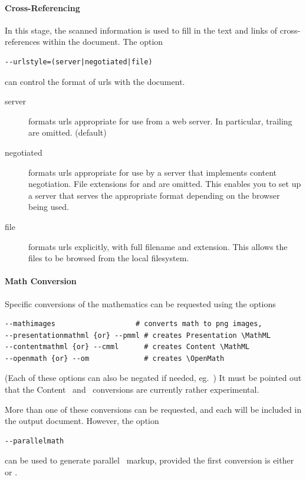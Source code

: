 \documentclass{book}
\begin{document}
\paragraph{Cross-Referencing}
In this stage, the scanned information is used to fill in the
text and links of cross-references within the document.
The option
\begin{lstlisting}[style=shell]
--urlstyle=(server|negotiated|file)
\end{lstlisting}
can control the format of urls with the document.
\begin{description}
  \item[server] formats urls appropriate for use from a web server.
    In particular, trailing  are omitted. (default)
  \item[negotiated] formats urls appropriate for use by a server
    that implements content negotiation. File extensions for 
    and  are omitted.  This enables you to set up a server
    that serves the appropriate format depending on the browser being used.
  \item[file] formats urls explicitly, with full filename and extension.
    This allows the files to be browsed from the local filesystem.
\end{description}

\paragraph{Math Conversion}
Specific conversions of the mathematics can be requested
using the options
\begin{lstlisting}[style=shell]
--mathimages                   # converts math to png images,
--presentationmathml {or} --pmml # creates Presentation \MathML
--contentmathml {or} --cmml      # creates Content \MathML
--openmath {or} --om             # creates \OpenMath
\end{lstlisting}
(Each of these options can also be negated if needed, eg.~)
It must be pointed out that the Content \MathML\ and \OpenMath\
conversions are currently rather experimental.

More than one of these conversions can be requested, and
each will be included in the output document.
However, the option
\begin{lstlisting}[style=shell]
--parallelmath
\end{lstlisting}
can be used to generate parallel \MathML\ markup, provided the first
conversion is either \code{--pmml} or \code{--cmml}.
\end{document}
